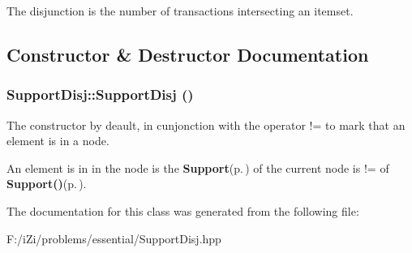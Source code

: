 The disjunction is the number of transactions intersecting an itemset. 



\subsection{Constructor \& Destructor Documentation}
\subsubsection{\setlength{\rightskip}{0pt plus 5cm}Support\-Disj::Support\-Disj ()\hspace{0.3cm}{\tt  [inline]}}\label{class_support_disj_f55cb6b997d16ef0a60148b3091af369}


The constructor by deault, in cunjonction with the operator != to mark that an element is in a node. 

An element is in in the node is the {\bf Support}{\rm (p.\,\pageref{class_support})} of the current node is != of {\bf Support()}{\rm (p.\,\pageref{class_support_19bf40018bf3004487c65f7e68c9f65e})}. 

The documentation for this class was generated from the following file:\begin{CompactItemize}
\item 
F:/i\-Zi/problems/essential/Support\-Disj.hpp\end{CompactItemize}
